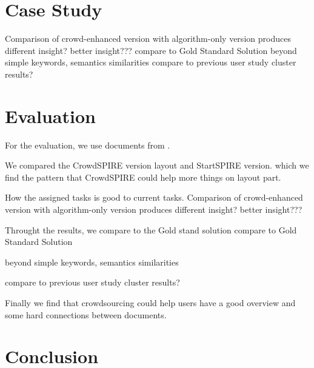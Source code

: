 \documentclass[journal]{vgtc}                %
\begin{document}
\section{Case Study}

Comparison of crowd-enhanced version with algorithm-only version
produces different insight?
better insight???
compare to Gold Standard Solution
beyond simple keywords, semantics similarities
compare to previous user study cluster results?

\section{Evaluation}

For the evaluation, we use documents from .

We compared the CrowdSPIRE version layout and StartSPIRE version.
which we find the pattern that CrowdSPIRE could help more things on layout part.

How the assigned tasks is good to current tasks.
Comparison of crowd-enhanced version with algorithm-only version
produces different insight?
better insight???




Throught the results, we compare to the Gold stand solution
compare to Gold Standard Solution


beyond simple keywords, semantics similarities


compare to previous user study cluster results?


Finally we find that crowdsourcing could help users have a good overview and some hard connections between documents.


\section{Conclusion}



%

%
%
%


\end{document}
